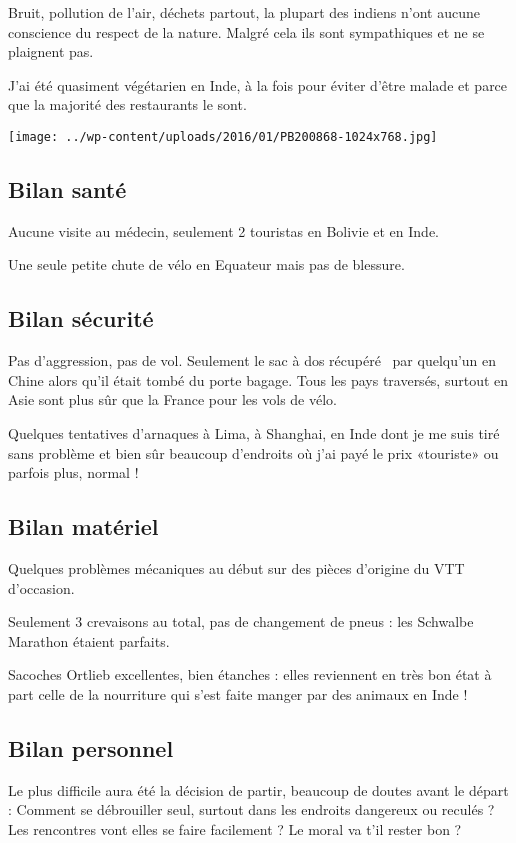  Bruit, pollution de l'air, déchets partout, la plupart des indiens n'ont aucune conscience du respect de la nature. Malgré cela ils sont sympathiques et ne se plaignent pas. 

 J'ai été quasiment végétarien en Inde, à la fois pour éviter d'être malade et parce que la majorité des restaurants le sont.
\begin{center} \texttt{[image: ../wp-content/uploads/2016/01/PB200868-1024x768.jpg]} \end{center}

 \subsection*{Bilan santé}
 Aucune visite au médecin, seulement 2 touristas en Bolivie et en Inde.

 Une seule petite chute de vélo en Equateur mais pas de blessure.

 \subsection*{Bilan sécurité}
 Pas d'aggression, pas de vol. Seulement le sac à dos \og récupéré \fg\ par quelqu'un en Chine alors qu'il était tombé du porte bagage. Tous les pays traversés, surtout en Asie sont plus sûr que la France pour les vols de vélo. 

 Quelques tentatives d'arnaques à Lima, à Shanghai, en Inde dont je me suis tiré sans problème et bien sûr beaucoup d'endroits où j'ai payé le prix «touriste» ou parfois plus, normal !

 \subsection*{Bilan matériel}
 Quelques problèmes mécaniques au début sur des pièces d'origine du VTT d'occasion.

 Seulement 3 crevaisons au total, pas de changement de pneus : les Schwalbe Marathon étaient parfaits. 

 Sacoches Ortlieb excellentes, bien étanches : elles reviennent en très bon état à part celle de la nourriture qui s'est faite manger par des animaux en Inde !

 \subsection*{Bilan personnel} 

 Le plus difficile aura été la décision de partir, beaucoup de doutes avant le départ : Comment se débrouiller seul, surtout dans les endroits dangereux ou reculés ? Les rencontres vont elles se faire facilement ? Le moral va t'il rester bon ?

